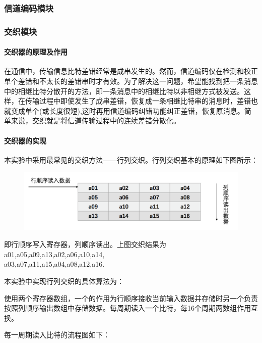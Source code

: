\documentclass[UTF8]{ctexart}
\begin{document}
\subsubsection{信道编码模块}


\subsubsection{交织模块}

\paragraph{交织器的原理及作用}

在通信中，传输信息比特差错经常是成串发生的。然而，信道编码仅在检测和校正单个差错和不太长的差错串时才有效。为了解决这一问题，希望能找到把一条消息中的相继比特分散开的方法，即一条消息中的相继比特以非相继方式被发送。这样，在传输过程中即使发生了成串差错，恢复成一条相继比特串的消息时，差错也就变成单个(或长度很短),这时再用信道编码纠错功能纠正差错，恢复原消息。简单来说，交织就是将信道传输过程中的连续差错分散化。

\paragraph{交织器的实现}

本实验中采用最常见的交织方法——行列交织。行列交织基本的原理如下图所示：

\begin{figure}[H]
    \centering
    \includegraphics[width=\textwidth]{images//inter_input.png}
\end{figure}

即行顺序写入寄存器，列顺序读出。上图交织结果为a01,a05,a09,a13,a02,a06,a10,a14,\\a03,a07,a11,a15,a04,a08,a12,a16.


本实验中实现行列交织的具体算法为：

使用两个寄存器数组，一个的作用为行顺序接收当前输入数据并存储时另一个负责按照列顺序输出数组中存储数据。每周期读入一个比特，每16个周期两数组作用互换。

每一周期读入比特的流程图如下：
\end{document}
